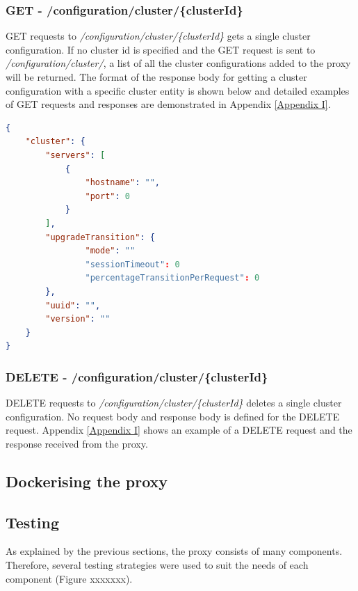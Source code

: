 \documentclass[a4paper,11pt,twoside]{article}
\begin{document}
\subsubsection{GET - /configuration/cluster/\{clusterId\}} 
GET requests to \textit{/configuration/cluster/\{clusterId\}} gets a single cluster configuration. If no cluster id is specified and the GET request is sent to \textit{/configuration/cluster/}, a list of all the cluster configurations added to the proxy will be returned. The format of the response body for getting a cluster configuration with a specific cluster entity is shown below and detailed examples of GET requests and responses are demonstrated in Appendix \ref{Appendix  I}.\bigskip

\begin{lstlisting}[language=json]
{
    "cluster": {
        "servers": [
            {
                "hostname": "",
                "port": 0
            }
        ],
        "upgradeTransition": {
                "mode": ""
                "sessionTimeout": 0  
                "percentageTransitionPerRequest": 0  
        },
        "uuid": "",
        "version": ""
    }
}

\end{lstlisting}

\subsubsection{DELETE - /configuration/cluster/\{clusterId\}}
DELETE requests to \textit{/configuration/cluster/\{clusterId\}} deletes a single cluster configuration. No request body and response body is defined for the DELETE request. Appendix \ref{Appendix I} shows an example of a DELETE request and the response received from the proxy.


\subsection{Dockerising the proxy}

\subsection{Testing}
As explained by the previous sections, the proxy consists of many components. Therefore, several testing strategies were used to suit the needs of each component (Figure xxxxxxx).\bigskip
\end{document}
